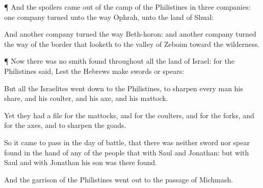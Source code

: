{\par }{\PP {}¶ And the
spoilers came
out of the
camp of the
Philistines in
three
companies:
one
company
turned unto the
way
{}
Ophrah, unto the
land of
Shual:

And
another
company
turned the
way
{}
Beth-horon: and
another
company
turned
{} the
way of the
border that
looketh to the
valley of
Zeboim toward the
wilderness.


\par }{\PP {}¶ Now there was no
smith
found throughout all the
land of
Israel: for the
Philistines
said, Lest the
Hebrews
make
{}
swords or
spears:

But all the
Israelites went
down to the
Philistines, to
sharpen every
man his
share, and his
coulter, and his
axe, and his
mattock.

Yet they had a
file for the
mattocks, and for the
coulters, and for the
forks, and for the
axes, and to
sharpen the
goads.

So it came to pass in the
day of
battle, that there was neither
sword nor
spear
found in the
hand of any of the
people that
{} with
Saul and
Jonathan: but with
Saul and with
Jonathan his
son was there
found.

And the
garrison of the
Philistines went
out to the
passage of
Michmash.




\par }
